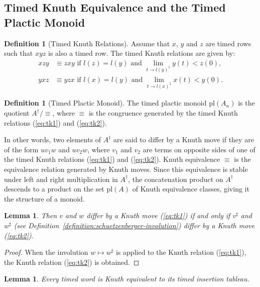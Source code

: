 \documentclass[10pt]{amsproc}
\newtheorem{lemma}[theorem]{Lemma}
\theoremstyle{definition}
\newtheorem{definition}[theorem]{Definition}
\theoremstyle{remark}
\newcommand{\pl}{\mathrm{pl}}
\begin{document}
\subsection{Timed Knuth Equivalence and the Timed Plactic Monoid}
\begin{definition}
  [Timed Knuth Relations]
  \label{sec:timed-knuth-equiv}
  Assume that $x$, $y$ and $z$ are timed rows such that $xyz$ is also a timed row.
  The timed Knuth relations are given by:
  \begin{align}
    \tag{$\kappa_1$}
    \label{eq:tk1}
    xzy & \equiv zxy \text{ if } l(z)=l(y) \text{ and } \lim_{t\to l(y)^1} y(t)<z(0),\\
    \tag{$\kappa_2$}
    \label{eq:tk2}
    yxz & \equiv yzx\text{ if } l(x)=l(y) \text{ and } \lim_{t\to l(x)^1} x(t)<y(0).
  \end{align}
\end{definition}
\begin{definition}
  [Timed Plactic Monoid]
  \label{definition:timed-plactic-monoid}
  The timed plactic monoid $\pl(A_n)$ is the quotient $A^\dagger/\equiv$, where $\equiv$ is the congruence generated by the timed Knuth relations (\ref{eq:tk1}) and (\ref{eq:tk2}).
\end{definition}
In other words, two elements of $A^\dagger$ are said to differ by a Knuth move if they are of the form $uv_1w$ and $uv_2w$, where $v_1$ and $v_2$ are terms on opposite sides of one of the timed Knuth relations (\ref{eq:tk1}) and (\ref{eq:tk2}).
Knuth equivalence $\equiv$ is the equivalence relation generated by Knuth moves.
Since this equivalence is stable under left and right multiplication in $A^\dagger$, the concatenation product on $A^\dagger$ descends to a product on the set $\pl(A)$ of Knuth equivalence classes, giving it the structure of a monoid.
\begin{lemma}
  \label{lemma:sharp-moves}
  Then $v$ and $w$ differ by a Knuth move (\ref{eq:tk1}) if and only if $v^\sharp$ and $w^\sharp$ (see Definition~\ref{definition:schuetzenberger-involution}) differ by a Knuth move (\ref{eq:tk2}).
\end{lemma}
\begin{proof}
  When the involution $w\mapsto w^\sharp$ is applied to the Knuth relation (\ref{eq:tk1}), the Knuth relation (\ref{eq:tk2}) is obtained.
\end{proof}
\begin{lemma}
  \label{lemma:reduction-to-tab}
  Every timed word is Knuth equivalent to its timed insertion tableau.
\end{lemma}
\end{document}
